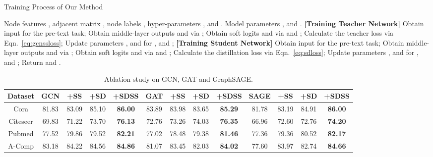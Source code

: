 \documentclass[letterpaper]{article} \usepackage{aaai22} \usepackage{times} \usepackage{helvet} \usepackage{courier} \usepackage[hyphens]{url} \usepackage{graphicx} \urlstyle{rm} \def\UrlFont{\rm} \usepackage{subfigure}
\begin{document}
	\begin{algorithm}[!h]
		\caption{Training Process of Our Method}
		\label{alg:algorithm}
		\begin{algorithmic}[1]
			\REQUIRE Node features , adjacent matrix , node labels , hyper-parameters ,  and .
			\ENSURE Model parameters ,  and .
			\STATE \textbf{[Training Teacher Network]}
			\STATE Obtain input  for the pre-text task;
			\STATE Obtain middle-layer outputs  and  via ;
			\STATE Obtain soft logits  and  via  and ;
			\STATE Calculate the teacher loss via Eqn.~\eqref{eq:gcnssloss};
			\STATE Update parameters ,  and  for ,  and ;
			\ENDFOR
			\STATE \textbf{[Training Student Network]}
			\STATE Obtain input  for the pre-text task;
			\STATE Obtain middle-layer outputs  and  via ;
			\STATE Obtain soft logits  and  via  and ;
			\STATE Calculate the distillation loss via Eqn.~\eqref{eq:sdloss};
			\STATE Update parameters ,  and  for ,  and ;
			\ENDFOR
			\STATE Return  and .
		\end{algorithmic}
	\end{algorithm}
	
	
	\begin{table*}[htbp]
		\centering
		\begin{tabular}{c|cccc|cccc|cccc}
			\hline
			Dataset 
			& \textbf{GCN} & +SS &+SD & +SDSS & \textbf{GAT} & +SS &+SD & +SDSS & \textbf{SAGE} &+SS &+SD & +SDSS \\ \hline
			Cora 
			& 81.83 &83.09 & 85.10 & \textbf{86.00}& 
			83.89 &83.98 & 83.65 &\textbf{ 85.29} & 
			81.78 &83.19 & 84.91 & \textbf{86.00 } \\
			Citeseer 
			& 69.83 &71.22 &73.70 & \textbf{76.13 } & 
			72.76 &73.26 & 74.03 & \textbf{76.35} & 
			66.96 & 72.60 & 72.76 & \textbf{74.20} \\
			Pubmed 
			& 77.52 &79.86 &79.52 & \textbf{82.21} & 
			77.02 & 78.48 & 79.38 & \textbf{81.46} & 
			77.36 &79.36 & 80.52 & \textbf{82.17} \\
			A-Comp 
			& 83.18 &84.22 &84.56 & \textbf{84.86} & 
			81.07 &83.45 &82.03 & \textbf{84.02} & 
			77.60 &83.97 & 82.74 & \textbf{84.66} \\ \hline
		\end{tabular}
		\caption{Ablation study on GCN, GAT and GraphSAGE.}
		\label{tab:res1}
	\end{table*}
	
\end{document}
